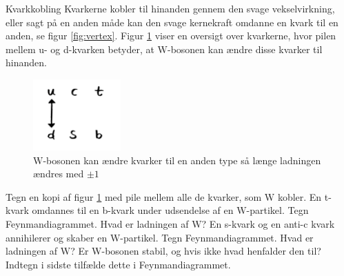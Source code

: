 \begin{opgave}{Kvarkkobling}
    Kvarkerne kobler til hinanden gennem den svage vekselvirkning, eller sagt på en anden måde kan den svage kernekraft omdanne en kvark til en anden, se figur \ref{fig:vertex}.  Figur \ref{fig:kvarkkobling} viser en oversigt over kvarkerne, hvor pilen mellem u- og d-kvarken betyder, at $\mathrm{W}$-bosonen kan ændre disse kvarker til hinanden. 
    \begin{figure}[h!]
        \centering
        \includegraphics[width=0.3\textwidth]{Partikel/figurer/kvarkkobling.png}
        \caption{$\mathrm{W}$-bosonen kan ændre kvarker til en anden type så længe ladningen ændres med $\pm 1$}
        \label{fig:kvarkkobling}
    \end{figure}
    \opg Tegn en kopi af figur \ref{fig:kvarkkobling} med pile mellem alle de kvarker, som $\mathrm{W}$ kobler. 
    \opg En t-kvark omdannes til en b-kvark under udsendelse af en $\mathrm{W}$-partikel. Tegn Feynmandiagrammet.
    \opg Hvad er ladningen af $\mathrm{W}$?
    \opg En s-kvark og en anti-c kvark annihilerer og skaber en $\mathrm{W}$-partikel. Tegn Feynmandiagrammet.
    \opg Hvad er ladningen af $\mathrm{W}$?
    \opg Er W-bosonen stabil, og hvis ikke hvad henfalder den til? Indtegn i sidste tilfælde dette i Feynmandiagrammet.
\end{opgave}

